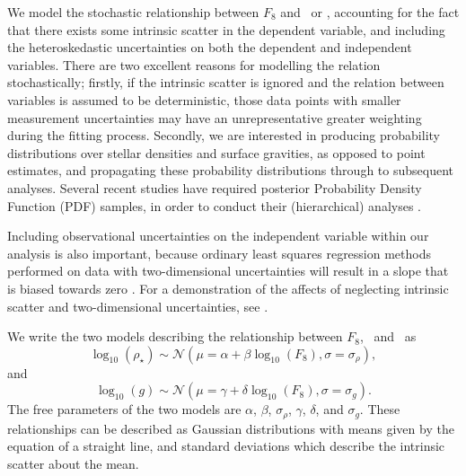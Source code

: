 We model the stochastic relationship between $F_8$ and \logg\ or \rhostar,
accounting for the fact that there exists some intrinsic scatter in
the dependent variable, and including the heteroskedastic uncertainties on both
the dependent and independent variables.
There are two excellent reasons for modelling the relation stochastically;
firstly, if the intrinsic scatter is ignored and the relation between
variables is assumed to be deterministic, those data points with smaller
measurement uncertainties may have an unrepresentative greater weighting
during the fitting process.
Secondly, we are interested in producing probability distributions over stellar
densities and surface gravities, as opposed to point estimates, and propagating
these probability distributions through to subsequent analyses.
Several recent studies have required posterior Probability Density
Function (PDF) samples, in order to conduct their (hierarchical)
analyses \citep[e.g.][]{foreman-mackey:2014, rogers:2015, angus:2015}.

Including observational uncertainties on the independent variable within our
analysis is also important, because ordinary least squares regression methods
performed on data with two-dimensional uncertainties will result in a slope
that is biased towards zero
\citep[e.g.][]{fuller:1987, fox:1997}.
For a demonstration of the affects of neglecting intrinsic scatter and
two-dimensional uncertainties, see \citet{kelly:2007}.

We write the two models describing the relationship between $F_8$, \logg\ and
\rhostar\ as
\begin{equation}
	\log_{10}(\rho_\star) \sim \mathcal{N}(\mu = \alpha + \beta
	\log_{10}(F_8), \sigma = \sigma_{\rho}),
\end{equation}
\label{eq:rho}
and
\begin{equation}
	\log_{10}(g) \sim \mathcal{N}(\mu = \gamma + \delta \log_{10}(F_8),
	\sigma = \sigma_g).
\end{equation}
\label{eq:logg}
The free parameters of the two models are $\alpha$, $\beta$, $\sigma_{\rho}$,
$\gamma$, $\delta$, and $\sigma_g$.
These relationships can be described as Gaussian distributions with means
given by the equation of a straight line, and standard deviations which
describe the intrinsic scatter about the mean.

